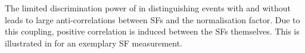 
The limited discrimination power of \mTW in distinguishing \ttbar events with
and without \faketauhadvis leads to large anti-correlations between
\faketauhadvis SFs and the \ttbar normalisation factor. Due to this coupling,
positive correlation is induced between the SFs themselves. This is illustrated
in  for an exemplary SF measurement.


